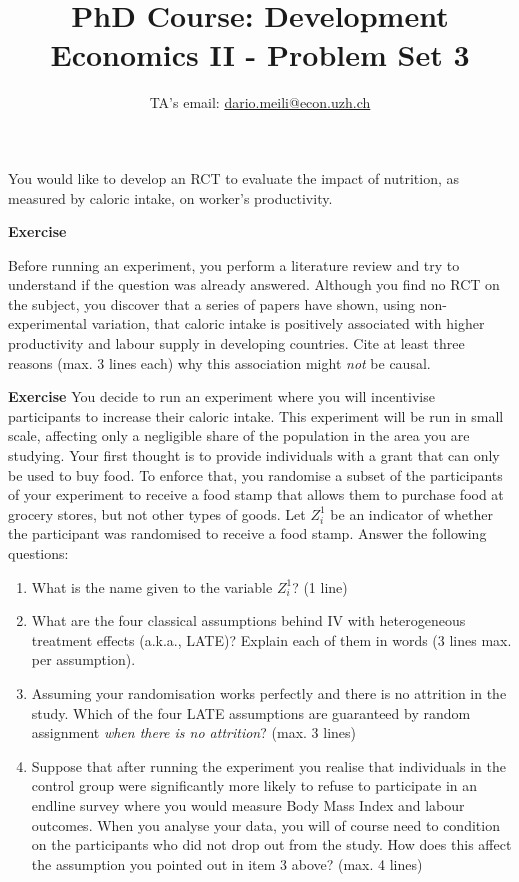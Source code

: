 \documentclass[10pt]{article}
\title{PhD Course: Development Economics II - Problem Set 3} %
\author{%
	\normalsize TA's email: \href{mailto:dario.meili@econ.uzh.ch}{dario.meili@econ.uzh.ch}
}
\date{} %
\newcounter{exercise}
\newenvironment{exercise}%
{%
	\refstepcounter{exercise}%
	\textbf{Exercise \theexercise}%
	}%
{
 \par\vspace{\baselineskip}%
\noindent\ignorespacesafterend
}
\begin{document}
\maketitle

You would like to develop an RCT to evaluate the impact of nutrition, as measured by caloric intake, on worker's productivity.

\begin{exercise}
	Before running an experiment, you perform a literature review and try to understand if the question was already answered. Although you find no RCT on the subject, you discover that a series of papers have shown, using non-experimental variation, that caloric intake is positively associated with higher productivity and labour supply in developing countries. Cite at least three reasons (max. 3 lines each) why this association might \textit{not} be causal.
\end{exercise}


\begin{exercise}\label{indep}
	You decide to run an experiment where you will incentivise participants to increase their caloric intake. This experiment will be run in small scale, affecting only a negligible share of the population in the area you are studying.
	Your first thought is to provide individuals with a grant that can only be used to buy food. To enforce that, you randomise a subset of the participants of your experiment to receive a food stamp that allows them to purchase food at grocery stores, but not other types of goods. Let $ Z^{1}_{i} $ be an indicator of whether the participant was randomised to receive a food stamp. Answer the following questions:
	\begin{enumerate}
		\item What is the name given to the variable $ Z^{1}_{i} $? (1 line)
		\item What are the four classical assumptions behind IV \citep{imbens1994} with heterogeneous treatment effects (a.k.a., LATE)? Explain each of them in words (3 lines max. per assumption).
		\item Assuming your randomisation works perfectly and there is no attrition in the study. Which of the four LATE assumptions are guaranteed by random assignment \textit{when there is no attrition}? (max. 3 lines)
		\item Suppose that after running the experiment you realise that individuals in the control group were significantly more likely to refuse to participate in an endline survey where you would measure Body Mass Index and labour outcomes. When you analyse your data, you will of course need to condition on the participants who did not drop out from the study. How does this affect the assumption you pointed out in item 3 above? (max. 4 lines)
	\end{enumerate}
\end{exercise}
\end{document}
